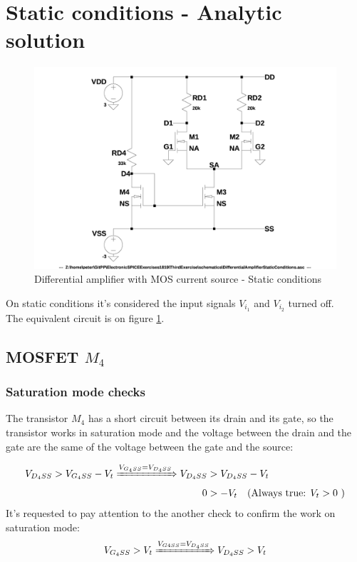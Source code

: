 \documentclass[10pt,a4paper]{book}
\begin{document}
\section{Static conditions - Analytic solution}

\begin{figure}[h]
  \centering
  \includegraphics[width=12cm]{schematics/DifferentialAmplifierStaticConditions.jpg}
  \caption{Differential amplifier with MOS current source - Static conditions}
  \label{DifferentialAmplifierStaticConditions}
\end{figure}

On static conditions it's considered the input signals $V_{i_1}$ and $V_{i_2}$ turned off.\\
The equivalent circuit is on figure \ref{DifferentialAmplifierStaticConditions}.\par

\subsection{MOSFET $M_4$}
\subsubsection{Saturation mode checks}\label{M4SatCheck}
The transistor $M_4$ has a short circuit between its drain and its gate, so the transistor works in saturation mode and the voltage between the drain and the gate are the same of the voltage between the gate and the source:\par
\begin{align}
V_{{D_4}SS} > V_{{G_4}SS} - V_t \xRightarrow{V_{{G_4}SS} = V_{{D_4}SS}}
V_{{D_4}SS} &> V_{{D_4}SS} - V_t\\
0 &> - V_t \quad \text{(Always true: }V_t > 0\text{ )}
\end{align}
It's requested to pay attention to the another check to confirm the work on saturation mode:
\begin{gather}
V_{{G_4}SS} > V_t \xRightarrow{V_{{G4}SS} = V_{{D_4}SS}} V_{{D_4}SS} > V_t \label{CheckSat2eq}
\end{gather}
\end{document}
